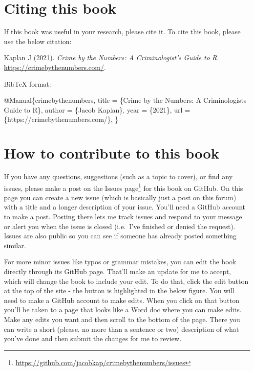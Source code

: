 \documentclass[
  a4paper,
]{krantz}
\makeatletter
\newenvironment{Shaded}{\begin{snugshade}}{\end{snugshade}}
\newcommand{\DataTypeTok}[1]{\textcolor[rgb]{0.13,0.29,0.53}{#1}}
\newcommand{\NormalTok}[1]{#1}
\newcommand{\OtherTok}[1]{\textcolor[rgb]{0.56,0.35,0.01}{#1}}
\newcommand{\VariableTok}[1]{\textcolor[rgb]{0.00,0.00,0.00}{#1}}
\renewcommand{\href}[2]{#2\footnote{\url{#1}}}
\newenvironment{kframe}{%
\medskip{}
\setlength{\fboxsep}{.8em}
 \def\at@end@of@kframe{}%
 \ifinner\ifhmode%
  \def\at@end@of@kframe{\end{minipage}}%
  \begin{minipage}{\columnwidth}%
 \fi\fi%
 \def\FrameCommand##1{\hskip\@totalleftmargin \hskip-\fboxsep
 \colorbox{shadecolor}{##1}\hskip-\fboxsep
     \hskip-\linewidth \hskip-\@totalleftmargin \hskip\columnwidth}%
 \MakeFramed {\advance\hsize-\width
   \@totalleftmargin\z@ \linewidth\hsize
   \@setminipage}}%
 {\par\unskip\endMakeFramed%
 \at@end@of@kframe}
\renewenvironment{Shaded}{\begin{kframe}}{\end{kframe}}
\makeatother
\begin{document}
\hypertarget{citing-this-book}{%
\section*{Citing this book}\label{citing-this-book}}

If this book was useful in your research, please cite it. To
cite this book, please use the below citation:

Kaplan J (2021). \emph{Crime by the Numbers: A
Criminologist's Guide to R}.
\url{https://crimebythenumbers.com/}.

BibTeX format:

\begin{Shaded}
\begin{Highlighting}[]
\VariableTok{@Manual}\NormalTok{\{}\OtherTok{crimebythenumbers}\NormalTok{,}
  \DataTypeTok{title}\NormalTok{ = \{Crime by the Numbers: A Criminologist\textquotesingle{}s Guide to R\},}
  \DataTypeTok{author}\NormalTok{ = \{Jacob Kaplan\},}
  \DataTypeTok{year}\NormalTok{ = \{2021\},}
  \DataTypeTok{url}\NormalTok{ = \{https://crimebythenumbers.com/\},}
\NormalTok{\}}
\end{Highlighting}
\end{Shaded}

\hypertarget{how-to-contribute-to-this-book}{%
\section*{How to contribute to this
book}\label{how-to-contribute-to-this-book}}

If you have any questions, suggestions (such as a topic to
cover), or find any issues, please make a post on the
\href{https://github.com/jacobkap/crimebythenumbers/issues}{Issues
page} for this book on GitHub. On this page you can create a
new issue (which is basically just a post on this forum)
with a title and a longer description of your issue. You'll
need a GitHub account to make a post. Posting there lets me
track issues and respond to your message or alert you when
the issue is closed (i.e.~I've finished or denied the
request). Issues are also public so you can see if someone
has already posted something similar.

For more minor issues like typos or grammar mistakes, you
can edit the book directly through its GitHub page. That'll
make an update for me to accept, which will change the book
to include your edit. To do that, click the edit button at
the top of the site - the button is highlighted in the below
figure. You will need to make a GitHub account to make
edits. When you click on that button you'll be taken to a
page that looks like a Word doc where you can make edits.
Make any edits you want and then scroll to the bottom of the
page. There you can write a short (please, no more than a
sentence or two) description of what you've done and then
submit the changes for me to review.
\end{document}
